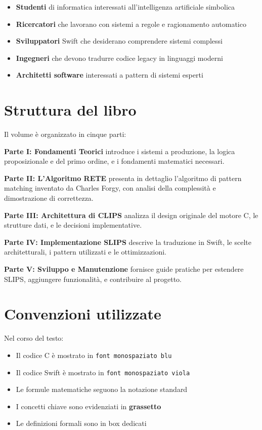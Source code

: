 \documentclass[12pt,a4paper,twoside,openright]{book}
\theoremstyle{definition}
\theoremstyle{remark}
\begin{document}
\begin{itemize}
\item \textbf{Studenti} di informatica interessati all'intelligenza artificiale simbolica
\item \textbf{Ricercatori} che lavorano con sistemi a regole e ragionamento automatico
\item \textbf{Sviluppatori} Swift che desiderano comprendere sistemi complessi
\item \textbf{Ingegneri} che devono tradurre codice legacy in linguaggi moderni
\item \textbf{Architetti software} interessati a pattern di sistemi esperti
\end{itemize}

\section*{Struttura del libro}

Il volume è organizzato in cinque parti:

\textbf{Parte I: Fondamenti Teorici} introduce i sistemi a produzione, la logica proposizionale e del primo ordine, e i fondamenti matematici necessari.

\textbf{Parte II: L'Algoritmo RETE} presenta in dettaglio l'algoritmo di pattern matching inventato da Charles Forgy, con analisi della complessità e dimostrazione di correttezza.

\textbf{Parte III: Architettura di CLIPS} analizza il design originale del motore C, le strutture dati, e le decisioni implementative.

\textbf{Parte IV: Implementazione SLIPS} descrive la traduzione in Swift, le scelte architetturali, i pattern utilizzati e le ottimizzazioni.

\textbf{Parte V: Sviluppo e Manutenzione} fornisce guide pratiche per estendere SLIPS, aggiungere funzionalità, e contribuire al progetto.

\section*{Convenzioni utilizzate}

Nel corso del testo:
\begin{itemize}
\item Il codice C è mostrato in \texttt{font monospaziato blu}
\item Il codice Swift è mostrato in \texttt{font monospaziato viola}
\item Le formule matematiche seguono la notazione standard
\item I concetti chiave sono evidenziati in \textbf{grassetto}
\item Le definizioni formali sono in box dedicati
\end{itemize}
\end{document}
